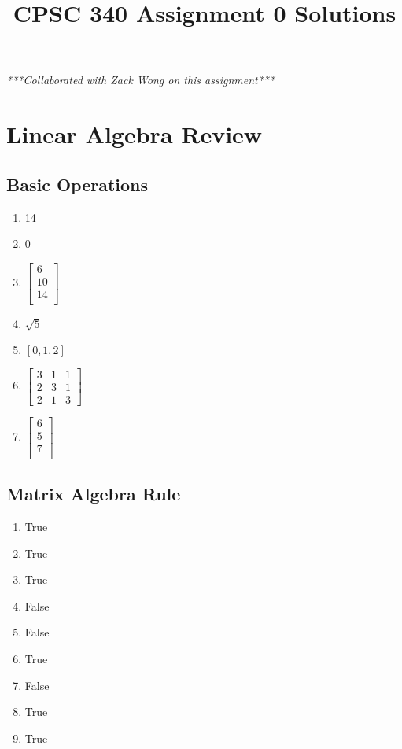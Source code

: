 \documentclass{article}
\def\enum#1{\begin{enumerate}#1\end{enumerate}}
\begin{document}
\title{CPSC 340 Assignment 0 Solutions}
\date{}
\maketitle
\vspace{-4em}

\textit{***Collaborated with Zack Wong on this assignment***}
\section{Linear Algebra Review}

\subsection{Basic Operations}

\enum{
\item 14
\item 0
\item $\left[\begin{array}{c}
6\\
10\\
14\\
\end{array}\right]$
\item $\sqrt{5}$
\item $\left[0, 1, 2\right]$
\item $
\left[\begin{array}{ccc}
	3 & 1 & 1\\
	2 & 3 & 1\\
	2 & 1 & 3
\end{array}\right]$
\item $\left[\begin{array}{c}
6\\
5\\
7\\	
\end{array}\right]$
}

\subsection{Matrix Algebra Rule}

\begin{enumerate}
\item True
\item True
\item True
\item False
\item False
\item True
\item False
\item True
\item True
\end{enumerate}
\end{document}
